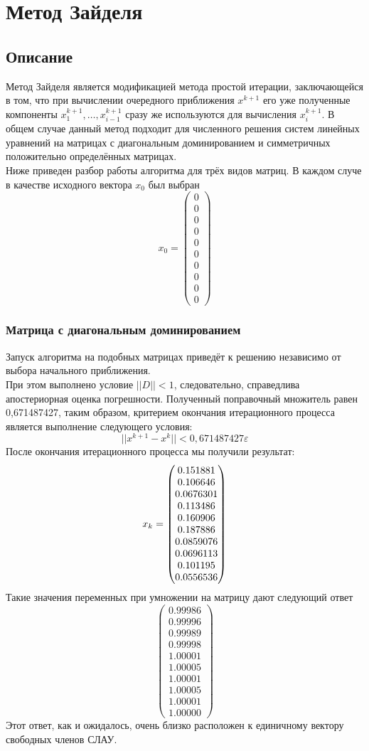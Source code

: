 \documentclass[../../report.tex]{subfiles}
\begin{document}
\chapter{Метод Зайделя}

\section{Описание}
Метод Зайделя является модификацией метода простой итерации, заключающейся в том, что при вычислении 
очередного приближения $x^{k+1}$ его уже полученные компоненты $x_1^{k+1},\dots,x_{i-1}^{k+1}$ сразу 
же используются для вычисления $x_i^{k+1}$. В общем случае данный метод подходит для численного решения 
систем линейных уравнений на матрицах с диагональным доминированием и симметричных положительно определённых матрицах. \\
Ниже приведен разбор работы алгоритма для трёх видов матриц. В каждом случе в качестве исходного вектора $x_0$ был выбран 
\[
x_0 = 
\begin{pmatrix} 
  0 \\ 
  0 \\ 
  0 \\ 
  0 \\ 
  0 \\ 
  0 \\ 
  0 \\ 
  0 \\ 
  0 \\ 
  0 
\end{pmatrix}
\]

\subsection{Матрица с диагональным доминированием}
Запуск алгоритма на подобных матрицах приведёт к 
решению независимо от выбора начального приближения. \\
При этом выполнено условие $||D|| < 1$, следовательно, справедлива апостериорная оценка погрешности. Полученный поправочный множитель равен 0,671487427, таким образом, критерием окончания итерационного процесса является выполнение следующего условия:
$$||x^{k+1} - x^k|| < 0,671487427\varepsilon$$
После окончания итерационного процесса мы получили результат:
\[
x_k = \begin{pmatrix} 0.151881 \\ 0.106646 \\ 0.0676301 \\ 0.113486 \\ 0.160906 \\ 0.187886 \\ 0.0859076 \\ 0.0696113 \\ 0.101195 \\ 0.0556536 \end{pmatrix}
\]
Такие значения переменных при умножении на матрицу дают следующий ответ
\[
\begin{pmatrix}
  0.99986 \\
  0.99996 \\
  0.99989 \\
  0.99998 \\
  1.00001 \\
  1.00005 \\
  1.00001 \\
  1.00005 \\
  1.00001 \\
  1.00000
\end{pmatrix}
\]
Этот ответ, как и ожидалось, очень близко расположен к единичному вектору свободных членов СЛАУ.
\end{document}
